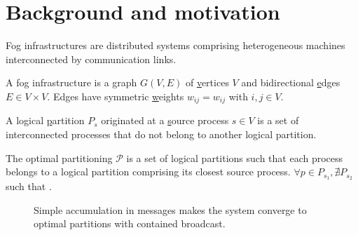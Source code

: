 
\section{Background and motivation}
\label{sec:background}

Fog infrastructures are distributed systems comprising heterogeneous
machines interconnected by communication links.

\begin{definition}
  A fog infrastructure is a \underline{g}raph $G(V, E)$ of
  \underline{v}ertices $V$ and bidirectional \underline{e}dges $E \in
  V \times V$. Edges have symmetric \underline{w}eights $w_{ij} =
  w_{ij}$ with $i, j \in V$.
\end{definition}

\begin{definition}
  A logical \underline{p}artition $P_s$ originated at a
  \underline{s}ource process $s \in V$ is a set of interconnected
  processes that do not belong to another logical partition.
\end{definition}

\begin{definition}
  The optimal partitioning $\mathcal{P}$ is a set of logical
  partitions such that each process belongs to a logical partition
  comprising its closest source process. $\forall p \in P_{s_1},
  \nexists P_{s_2}$ such that .
\end{definition}


\begin{figure*}
  \begin{center}
    \subfloat[Part A][\label{fig:addA}Both Process $a$ and
      Process $c$ initiate a partition.
      $w_{ab} = 1.5$; $w_{bc} = w_{cd} = w_{bd} = 1$.]{}
    \hspace{5pt}
    \hspace{5pt}
    \hspace{5pt}
    \caption{\label{fig:add}Simple accumulation in messages makes the
      system converge to optimal partitions with contained
      broadcast.}
  \end{center}
\end{figure*}

